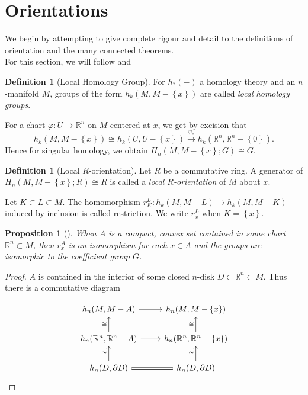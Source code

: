 \documentclass[reqno]{amsart}
\newtheorem{proposition}[theorem]{Proposition}
\theoremstyle{definition}
\newtheorem{definition}[theorem]{Definition}
\theoremstyle{remark}
\begin{document}
\section{Orientations}

We begin by attempting to give complete rigour and detail
to the definitions of orientation and the many connected
theorems.\\
\linebreak
For this section, we will follow 
\cite{Bredon} and \cite{Dieck}

\begin{definition}[Local Homology Group]
    For $h_*(-)$ a homology theory
    and an $n$-manifold $M$, groups of the form
    $h_k(M , M-\left\{ x \right\} )$ are called
    \textit{local homology groups}.
\end{definition}

For a chart $\varphi  \colon U \to \mathbb{R}^{n}$ 
on $M$ centered at $x$, we get by excision that
\[
h_k(M, M-\left\{ x \right\} ) 
\cong h_k\left( U, U- \left\{ x \right\}  \right) 
\stackrel{\varphi_*}{\to} h_k\left( \mathbb{R}^{n},
\mathbb{R}^{n} - \left\{ 0 \right\} \right) .
\] 
Hence for singular homology, we obtain
$H_n\left( M, M - \left\{ x \right\} ; G \right) 
\cong G$.


\begin{definition}[Local $R$-orientation]
    Let $R$ be a commutative ring.
    A generator of
    $H_n\left( M, M - \left\{ x \right\} ; R \right) 
    \cong R$ is called a 
    \textit{local $R$-orientation} of $M$ about $x$.
\end{definition}

Let $K \subset L \subset M$. The homomorphism
$r_{K}^{L} \colon h_k (M, M-L) \to 
h_k(M, M-K)$ induced by inclusion is
called restriction. We write
$r_{x}^{L}$ when $K = \left\{ x \right\} $.

\begin{proposition}[]
    When $A$ is a compact, convex set contained
    in some chart $\mathbb{R}^{n} \subset M$, then
    $r_{x}^{A}$ is an isomorphism for each
    $x \in A$ and the
    groups are isomorphic to the coefficient group
    $G$.
\end{proposition}

\begin{proof}
    $A$ is contained in the interior of some
    closed $n$-disk $D \subset \mathbb{R}^{n} \subset M$.
    Thus there is a commutative diagram

    \begin{equation*}
    \begin{tikzcd}
        h_n(M, M-A) \ar[r] & h_n(M, M- \left\{ x \right\} )\\
        h_n(\mathbb{R}^{n}, \mathbb{R}^{n} - A) 
        \ar[u, "\cong"] \ar[r] & 
        h_n(\mathbb{R}^{n}, \mathbb{R}^{n} - \left\{ x \right\} )
        \ar[u, "\cong"] \\
        h_n(D, \partial D) 
        \ar[u, "\cong"] \ar[r, equal] &
        h_n(D, \partial D) \ar[u, "\cong"]
    \end{tikzcd}
    \end{equation*}
\end{proof}
\end{document}

